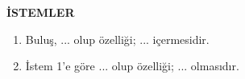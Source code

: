 
\begin{center}
    \textbf{İSTEMLER}
\end{center}

\begin{enumerate}
    \item Buluş, ... olup özelliği; ... içermesidir.
    
    \item İstem 1'e göre ... olup özelliği; ... olmasıdır.
\end{enumerate}
